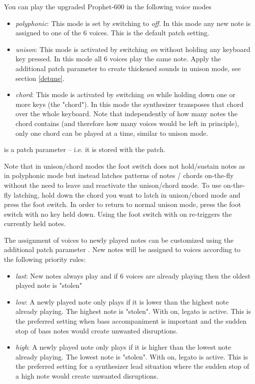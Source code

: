 You can play the upgraded Prophet-600 in the following voice modes
\begin{itemize}
  \setlength\itemsep{0cm}
  \item \textit{polyphonic}: This mode is set by switching \unison to \textit{off}. In this mode any new note is assigned to one of the 6 voices. This is the default patch setting.
  \item \textit{unison}: This mode is activated by switching \unison \textit{on} without holding any keyboard key pressed. In this mode all 6 voices play the same note. Apply the additional patch parameter \detune to create thickened sounds in unison mode, see section \ref{detune}.
  \item \textit{chord}: This mode is activated by switching \unison \textit{on} while holding down one or more keys (the "chord"). In this mode the synthesizer transposes that chord over the whole keyboard. Note that independently of how many notes the chord contains (and therefore how many voices would be left in principle), only one chord can be played at a time, similar to unison mode.
\end{itemize} 

\unison is a patch parameter -- i.e. it is stored with the patch.

Note that in unison/chord modes the foot switch does not hold/sustain notes as in polyphonic mode but instead latches patterns of notes / chords on-the-fly without the need to leave and reactivate the unison/chord mode. To use on-the-fly latching, hold down the chord you want to latch in unison/chord mode and press the foot switch. In order to return to normal unison mode, press the foot switch with no key held down. Using the foot switch with \unison on re-triggers the currently held notes. 

The assignment of voices to newly played notes can be customized using the additional patch parameter \prio. New notes will be assigned to voices according to the following priority rules:

\begin{itemize}
  \setlength\itemsep{0cm}
  \item \textit{last}: New notes always play and if 6 voices are already playing then the oldest played note is "stolen"
  \item \textit{low}: A newly played note only plays if it is lower than the highest note already playing. The highest note is "stolen". With \unison on, legato is active. This is the preferred setting when bass accompaniment is important and the sudden stop of bass notes would create unwanted disruptions. 
  \item \textit{high}: A newly played note only plays if it is higher than the lowest note already playing. The lowest note is "stolen". With \unison on, legato is active. This is the preferred setting for a synthesizer lead situation where the sudden stop of a high note would create unwanted disruptions. 
\end{itemize}

